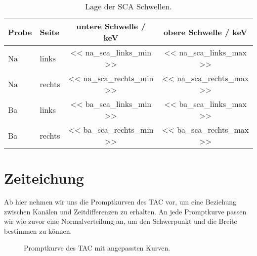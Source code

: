 \begin{table}[htpb]
    \centering
    \begin{tabular}{llSS}
        Probe & Seite & {untere Schwelle / \si{\kilo\electronvolt}} & {obere
    Schwelle} / \si{\kilo\electronvolt} \\
        \midrule
        Na & links & << na_sca_links_min >> & << na_sca_links_max >> \\
        Na & rechts & << na_sca_rechts_min >> & << na_sca_rechts_max >> \\
        Ba & links & << ba_sca_links_min >> & << ba_sca_links_max >> \\
        Ba & rechts & << ba_sca_rechts_min >> & << ba_sca_rechts_max >> \\
    \end{tabular}
    \caption{%
        Lage der SCA Schwellen.
    }
    \label{tab:sca_schwellen}
\end{table}


\section{Zeiteichung}

Ab hier nehmen wir uns die Promptkurven des TAC vor, um eine Beziehung
zwischen Kanälen und Zeitdifferenzen zu erhalten. An jede Promptkurve passen
wir wie zuvor eine Normalverteilung an, um den Schwerpunkt und die Breite
bestimmen zu können.

\begin{figure}[htbp]
    \centering
    \caption{%
        Promptkurve des TAC mit angepassten Kurven.
    }
    \label{fig:fit:promptkurve}
\end{figure}

